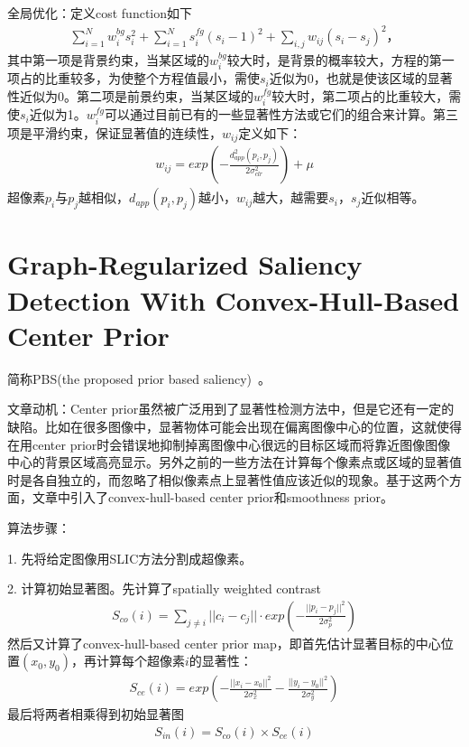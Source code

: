 \documentclass[12pt]{article}
\begin{document}
全局优化：定义cost function如下
\begin{align}
\sum_{i=1}^{N}w_i^{bg}s_i^2+\sum_{i=1}^{N}s_i^{fg}(s_i-1)^2+\sum_{i, j}w_{ij}(s_i-s_j)^2，
\end{align}
其中第一项是背景约束，当某区域的$w_i^{bg}$较大时，是背景的概率较大，方程的第一项占的比重较多，为使整个方程值最小，需使$s_i$近似为0，也就是使该区域的显著性近似为0。第二项是前景约束，当某区域的$w_i^{fg}$较大时，第二项占的比重较大，需使$s_i$近似为1。$w_i^{fg}$可以通过目前已有的一些显著性方法或它们的组合来计算。第三项是平滑约束，保证显著值的连续性，$w_{ij}$定义如下：
\begin{align}
w_{ij} = exp(-\frac{d_{app}^2(p_i, p_j)}{2\sigma_{clr}^2})+\mu
\end{align}
超像素$p_i$与$p_j$越相似，$d_{app}(p_i, p_j)$越小，$w_{ij} $越大，越需要$s_i$，$s_j$近似相等。

\section{Graph-Regularized Saliency Detection With Convex-Hull-Based Center Prior}

简称PBS(the proposed prior based saliency)~\cite{yang2013graph}。

文章动机：Center prior虽然被广泛用到了显著性检测方法中，但是它还有一定的缺陷。比如在很多图像中，显著物体可能会出现在偏离图像中心的位置，这就使得在用center prior时会错误地抑制掉离图像中心很远的目标区域而将靠近图像图像中心的背景区域高亮显示。另外之前的一些方法在计算每个像素点或区域的显著值时是各自独立的，而忽略了相似像素点上显著性值应该近似的现象。基于这两个方面，文章中引入了convex-hull-based center prior和smoothness prior。

算法步骤：

1. 先将给定图像用SLIC方法分割成超像素。

2. 计算初始显著图。先计算了spatially weighted contrast
\begin{align}
S_{co}(i) = \sum_{j \ne i}||c_i-c_j|| \cdot exp\left(-\frac{||p_i-p_j||^2}{2\sigma_p^2}\right)
\end{align}
然后又计算了convex-hull-based center prior map，即首先估计显著目标的中心位置$(x_0, y_0)$，再计算每个超像素$i$的显著性：
\begin{align}
S_{ce}(i) = exp\left(-\frac{||x_i-x_0||^2}{2\sigma_x^2}-\frac{||y_i-y_0||^2}{2\sigma_y^2}\right)
\end{align}
最后将两者相乘得到初始显著图
\begin{align}
S_{in}(i) = S_{co}(i) \times S_{ce}(i)
\end{align}
\end{document}
